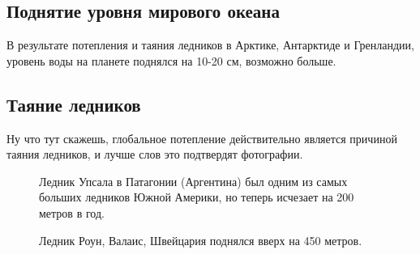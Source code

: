 \documentclass[a4paper,12pt]{ncc}
\begin{document}
 \subsection{Поднятие уровня мирового океана}
 \label{sec:subsection}
В результате потепления и таяния ледников в Арктике, Антарктиде и Гренландии, уровень воды на планете поднялся на 10-20 см, возможно больше.\cite[Волкова]{volkova-2006}


 \subsection{Таяние ледников}
 \label{sec:subsection}
Ну что тут скажешь, глобальное потепление действительно является причиной таяния ледников, и лучше слов это подтвердят фотографии.

\begin{figure}[h]
\caption{Ледник Упсала в Патагонии (Аргентина) был одним из самых больших ледников Южной Америки, но теперь исчезает на 200 метров в год.}
\label{fig:image}
\end{figure}

\begin{figure}[h]
\caption{Ледник Роун, Валаис, Швейцария поднялся вверх на 450 метров.}
\label{fig:image}
\end{figure}
\end{document}
